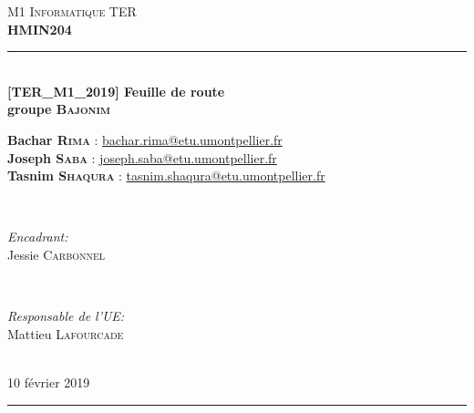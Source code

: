 \documentclass[12pt,a4paper]{report}
\newcommand{\HRule}{\rule{\linewidth}{0.5mm}} %
\begin{document}
\centering

\textsc{\large M1 Informatique TER}\\[0.25cm]
\textsc{\large \textbf{HMIN204}}\\[0.25cm]

\HRule \\[0.4cm]
{ \large \bfseries [TER\_M1\_2019] Feuille de route}\\[0.4cm]
{ \large \bfseries groupe \textsc{Bajonim}}\\[0.4cm]
\begin{minipage}{\textwidth}
\centering
\small
\textbf{Bachar \textsc{Rima}} : \href{mailto:bachar.rima@etu.umontpellier.fr}{bachar.rima@etu.umontpellier.fr}\\ %
\textbf{Joseph \textsc{Saba}} : \href{mailto:joseph.saba@etu.umontpellier.fr}{joseph.saba@etu.umontpellier.fr}\\ %
\textbf{Tasnim \textsc{Shaqura}} : \href{mailto:tasnim.shaqura@etu.umontpellier.fr}{tasnim.shaqura@etu.umontpellier.fr}\\ %
\end{minipage} \\[0.4cm]

\begin{minipage}[b]{0.4\textwidth}
\begin{flushleft} \small
\emph{Encadrant:} \\
Jessie \textsc{Carbonnel} %
\end{flushleft}
\end{minipage}
~
\begin{minipage}[b]{0.4\textwidth}
\begin{flushright} \small
\emph{Responsable de l'UE:} \\
Mattieu \textsc{Lafourcade} %
\end{flushright}
\end{minipage}\\[0.4cm]
{ \large 10 février 2019}\\[0.25cm]
\HRule

\end{document}
